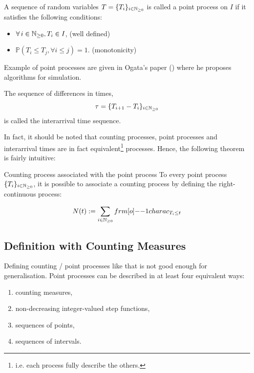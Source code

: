 \begin{definition}
\label{def:point}
A sequence of random variables $T = \{  T_i  \}_{ i \in \mathbb{N}_{\geq 0}} $ is called a point process on $I$ if it satisfies the following conditions:

\begin{itemize}
\item $\forall i \in \N, T_i \in I$, (well defined)
\item $\mathbb P ( T_i \leq T_j, \forall i \leq j) = 1$. (monotonicity)
\end{itemize}
\end{definition}

Example of point processes are given in Ogata's paper (\cite{Ogata}) where he proposes algorithms for simulation.


\begin{remarque}
\label{remarque:inter_arrival_times}
The sequence of differences in times, $$\tau = \{  T_{i+1} - T_i  \}_{ i \in \mathbb{N}_{\geq 0}} $$ is called the interarrival time sequence.
\end{remarque}


In fact, it should be noted that counting processes, point processes and interarrival times are in fact equivalent\footnote{i.e. each process fully describe the others.} processes. Hence, the following theorem is fairly intuitive:

\begin{theoreme}{Counting process associated with the point process}
To every point process $\{ T_i \}_{ i \in \mathbb{N}_{\geq 0}}$, it is possible to associate a counting process by defining the right-continuous process:

$$ N(t) := \sum_{ i \in \N} \11charac_{ T_i \leq t } $$ 

\end{theoreme}

\subsection{Definition with Counting Measures}
Defining counting / point processes like that is not good enough for generalisation. Point processes can be described in at least four equivalent ways:

\begin{enumerate}
\item counting measures,
\item non-decreasing integer-valued step functions,
\item sequences of points,
\item sequences of intervals.
\end{enumerate}


